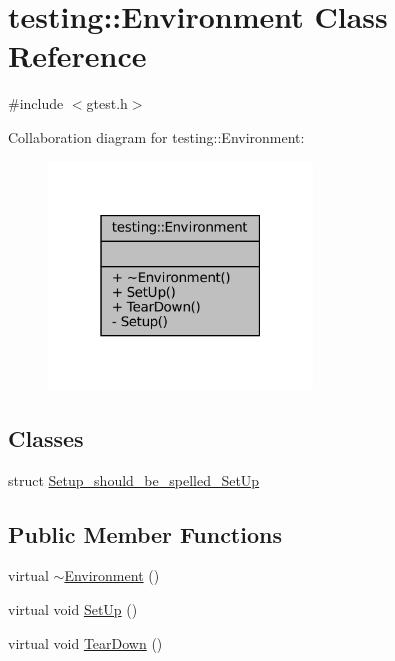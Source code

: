 \hypertarget{classtesting_1_1Environment}{}\section{testing\+:\+:Environment Class Reference}
\label{classtesting_1_1Environment}


{\ttfamily \#include $<$gtest.\+h$>$}



Collaboration diagram for testing\+:\+:Environment\+:
\nopagebreak
\begin{figure}[H]
\begin{center}
\leavevmode
\includegraphics[width=199pt]{classtesting_1_1Environment__coll__graph}
\end{center}
\end{figure}
\subsection*{Classes}
\begin{DoxyCompactItemize}
\item 
struct \hyperlink{structtesting_1_1Environment_1_1Setup__should__be__spelled__SetUp}{Setup\+\_\+should\+\_\+be\+\_\+spelled\+\_\+\+Set\+Up}
\end{DoxyCompactItemize}
\subsection*{Public Member Functions}
\begin{DoxyCompactItemize}
\item 
virtual \hyperlink{classtesting_1_1Environment_a0e41c320362576d752cd1f44cabd57d4}{$\sim$\+Environment} ()
\item 
virtual void \hyperlink{classtesting_1_1Environment_a1bf8cafaa9d4eba9feb98655ee434eb3}{Set\+Up} ()
\item 
virtual void \hyperlink{classtesting_1_1Environment_a039bdaa705c46b9b88234cf4d3bb6254}{Tear\+Down} ()
\end{DoxyCompactItemize}
